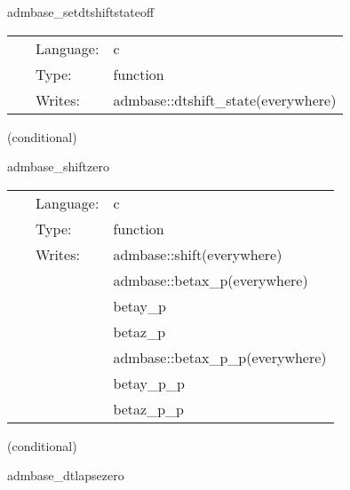 \hspace{5mm} admbase\_setdtshiftstateoff 

\hspace{5mm}{\it set the dtshift\_state variable to 0 } 


\hspace{5mm}

 \begin{tabular*}{160mm}{cll} 
~ & Language:  & c \\ 
~ & Type:  & function \\ 
~ & Writes:  & admbase::dtshift\_state(everywhere) \\ 
\end{tabular*} 


\vspace{5mm}

   (conditional) 

\hspace{5mm} admbase\_shiftzero 

\hspace{5mm}{\it set the shift to 0 at all points } 


\hspace{5mm}

 \begin{tabular*}{160mm}{cll} 
~ & Language:  & c \\ 
~ & Type:  & function \\ 
~ & Writes:  & admbase::shift(everywhere) \\ 
~& ~ &admbase::betax\_p(everywhere)\\ 
~& ~ &betay\_p\\ 
~& ~ &betaz\_p\\ 
~& ~ &admbase::betax\_p\_p(everywhere)\\ 
~& ~ &betay\_p\_p\\ 
~& ~ &betaz\_p\_p\\ 
\end{tabular*} 


\vspace{5mm}

   (conditional) 

\hspace{5mm} admbase\_dtlapsezero 

\hspace{5mm}{\it set the dtlapse to 0 at all points } 


\hspace{5mm}

